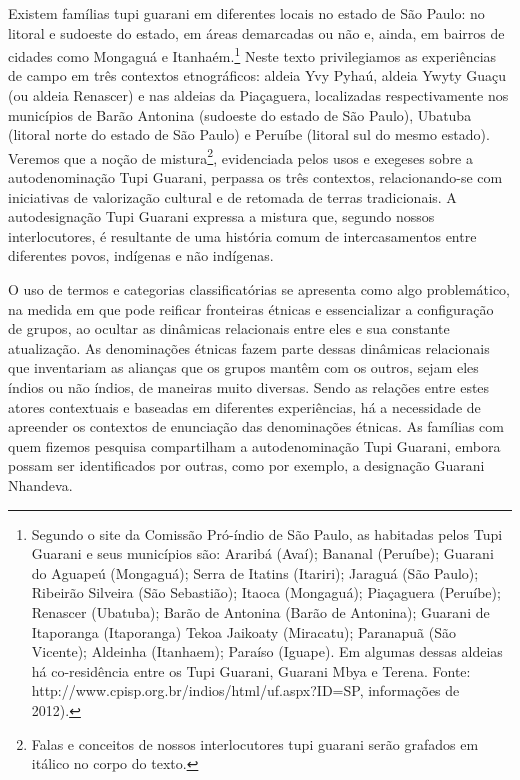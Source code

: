 Existem famílias tupi guarani em diferentes locais no estado de São
Paulo: no litoral e sudoeste do estado, em áreas demarcadas ou não e,
ainda, em bairros de cidades como Mongaguá e Itanhaém.\footnote{Segundo
o site da Comissão Pró-índio de São Paulo, as  habitadas pelos Tupi
Guarani e seus municípios são: Araribá (Avaí); Bananal (Peruíbe);
Guarani do Aguapeú (Mongaguá); Serra de Itatins (Itariri); Jaraguá (São
Paulo); Ribeirão Silveira (São Sebastião); Itaoca (Mongaguá);
Piaçaguera (Peruíbe); Renascer (Ubatuba); Barão de Antonina (Barão de
Antonina); Guarani de Itaporanga (Itaporanga) Tekoa Jaikoaty
(Miracatu); Paranapuã (São Vicente); Aldeinha (Itanhaem); Paraíso
(Iguape). Em algumas dessas aldeias há co-residência entre os Tupi
Guarani, Guarani Mbya e Terena. Fonte: http://www.cpisp.org.br/indios/html/uf.aspx?ID=SP, informações de
2012).} Neste texto privilegiamos as experiências de campo em três
contextos etnográficos: aldeia Yvy Pyhaú, aldeia Ywyty Guaçu (ou aldeia
Renascer) e nas aldeias da  Piaçaguera, localizadas respectivamente
nos municípios de Barão Antonina (sudoeste do estado de São Paulo),
Ubatuba (litoral norte do estado de São Paulo) e Peruíbe (litoral sul
do mesmo estado). Veremos que a noção de mistura\footnote{Falas e
conceitos de nossos interlocutores tupi guarani serão grafados em
itálico no corpo do texto.}, evidenciada pelos usos e exegeses sobre a
autodenominação Tupi Guarani, perpassa os três contextos,
relacionando-se com iniciativas de valorização cultural e de retomada
de terras tradicionais. A autodesignação Tupi Guarani expressa a
mistura que, segundo nossos interlocutores, é resultante de uma história
comum de intercasamentos entre diferentes povos, indígenas e não
indígenas. 

O uso de termos e categorias classificatórias se apresenta como algo
problemático, na medida em que pode reificar fronteiras étnicas e
essencializar a configuração de grupos, ao ocultar as dinâmicas
relacionais entre eles e sua constante atualização. As denominações
étnicas fazem parte dessas dinâmicas relacionais que inventariam as
alianças que os grupos mantêm com os outros, sejam eles índios ou não
índios, de maneiras muito diversas. Sendo as relações entre estes
atores contextuais e baseadas em diferentes experiências, há a
necessidade de apreender os contextos de enunciação das denominações
étnicas. As famílias com quem fizemos pesquisa compartilham a
autodenominação Tupi Guarani, embora possam ser identificados por
outras, como por exemplo, a designação Guarani Nhandeva.

